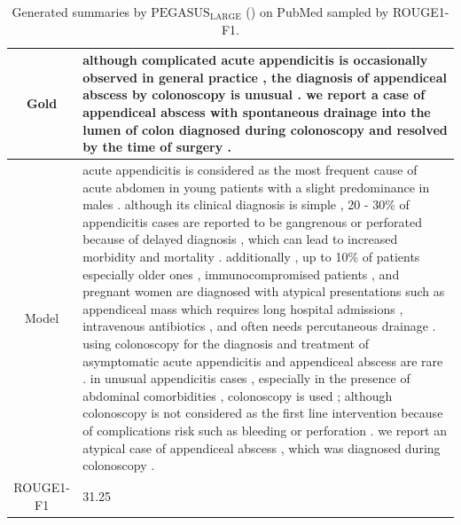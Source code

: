\begin{table}[bth!]
\begin{tabular}{c|p{}}
\\ \hline
Gold & 
although complicated acute appendicitis is occasionally observed in general practice , the diagnosis of appendiceal abscess by colonoscopy is unusual . we report a case of appendiceal abscess with spontaneous drainage into the lumen of colon diagnosed during colonoscopy and resolved by the time of surgery .
\\ \hline
Model & 
acute appendicitis is considered as the most frequent cause of acute abdomen in young patients with a slight predominance in males . although its clinical diagnosis is simple , 20 - 30\% of appendicitis cases are reported to be gangrenous or perforated because of delayed diagnosis , which can lead to increased morbidity and mortality . additionally , up to 10\% of patients especially older ones , immunocompromised patients , and pregnant women are diagnosed with atypical presentations such as appendiceal mass which requires long hospital admissions , intravenous antibiotics , and often needs percutaneous drainage . using colonoscopy for the diagnosis and treatment of asymptomatic acute appendicitis and appendiceal abscess are rare . in unusual appendicitis cases , especially in the presence of abdominal comorbidities , colonoscopy is used ; although colonoscopy is not considered as the first line intervention because of complications risk such as bleeding or perforation . we report an atypical case of appendiceal abscess , which was diagnosed during colonoscopy .
\\ \hline
ROUGE1-F1 & 
31.25
\\ \hline
\end{tabular}
\caption{Generated summaries by $\text{PEGASUS}_{\text{LARGE}}$ (\gnews) on PubMed sampled by ROUGE1-F1.}
\end{table}
